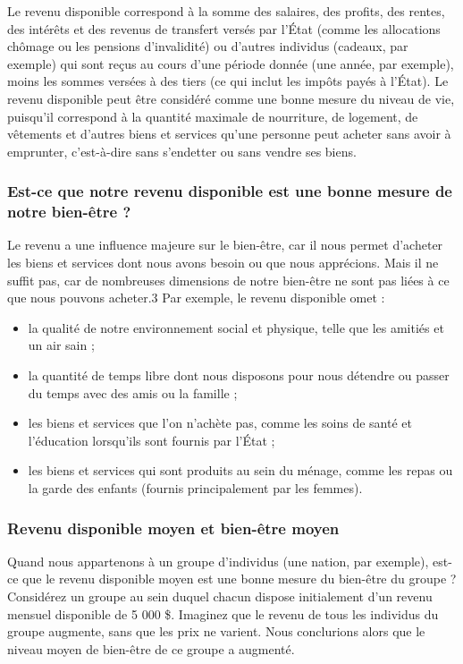 \documentclass[11pt]{amsart}
\begin{document}
Le revenu disponible correspond à la somme des salaires, des profits, des rentes, des intérêts et des revenus de transfert versés par l’État (comme les allocations chômage ou les pensions d’invalidité) ou d’autres individus (cadeaux, par exemple) qui sont reçus au cours d’une période donnée (une année, par exemple), moins les sommes versées à des tiers (ce qui inclut les impôts payés à l’État). Le revenu disponible peut être considéré comme une bonne mesure du niveau de vie, puisqu’il correspond à la quantité maximale de nourriture, de logement, de vêtements et d’autres biens et services qu’une personne peut acheter sans avoir à emprunter, c’est-à-dire sans s’endetter ou sans vendre ses biens.


\hypertarget{x-est-ce-que-notre-revenu-disponible-est-une-bonne-mesure-de-notre-bien-être-?}{\subsubsection*{Est-ce que notre revenu disponible est une bonne mesure de notre bien-être ?}}
Le revenu a une influence majeure sur le bien-être, car il nous permet d’acheter les biens et services dont nous avons besoin ou que nous apprécions. Mais il ne suffit pas, car de nombreuses dimensions de notre bien-être ne sont pas liées à ce que nous pouvons acheter.3
Par exemple, le revenu disponible omet :


\begin{itemize}

\item la qualité de notre environnement social et physique, telle que les amitiés et un air sain ;

\item la quantité de temps libre dont nous disposons pour nous détendre ou passer du temps avec des amis ou la famille ;

\item les biens et services que l’on n’achète pas, comme les soins de santé et l’éducation lorsqu’ils sont fournis par l’État ;

\item les biens et services qui sont produits au sein du ménage, comme les repas ou la garde des enfants (fournis principalement par les femmes).

\end{itemize}


\hypertarget{x-revenu-disponible-moyen-et-bien-être-moyen}{\subsubsection*{Revenu disponible moyen et bien-être moyen}}
Quand nous appartenons à un groupe d’individus (une nation, par exemple), est-ce que le revenu disponible moyen est une bonne mesure du bien-être du groupe ? Considérez un groupe au sein duquel chacun dispose initialement d’un revenu mensuel disponible de 5 000 \$. Imaginez que le revenu de tous les individus du groupe augmente, sans que les prix ne varient. Nous conclurions alors que le niveau moyen de bien-être de ce groupe a augmenté.
\end{document}
